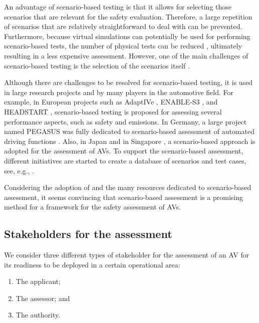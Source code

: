 \documentclass[twoside,twocolumn,9pt]{article}
\theoremstyle{plain}
\theoremstyle{remark}\newtheorem{remarkenv}{Remark}        %
\begin{document}
An advantage of scenario-based testing is that it allows for selecting those scenarios that are relevant for the safety evaluation. Therefore, a large repetition of scenarios that are relatively straightforward to deal with can be prevented. Furthermore, because virtual simulations can potentially be used for performing scenario-based tests, the number of physical tests can be reduced \autocite{ploeg2018cetran}, ultimately resulting in a less expensive assessment. However, one of the main challenges of scenario-based testing is the selection of the scenarios itself \autocite{riedmaier2020survey}. 

Although there are challenges to be resolved for scenario-based testing, it is used in large research projects and by many players in the automotive field. For example, in European projects such as AdaptIVe \autocite{roesener2017comprehensive}, ENABLE-S3 \autocite{leitner2019validation}, and HEADSTART \autocite{wagener2020headstart}, scenario-based testing is proposed for assessing several performance aspects, such as safety and emissions. In Germany, a large project named PEGASUS was fully dedicated to scenario-based assessment of automated driving functions \autocite{pegasus2019}. Also, in Japan \autocite{jacobo2019development} and in Singapore \autocite{cetran2020}, a scenario-based approach is adopted for the assessment of AVs. To support the scenario-based assessment, different initiatives are started to create a database of scenarios and test cases, see, e.g., \autocite{elrofai2018scenario,myers2020pass}.

Considering the adoption of and the many resources dedicated to scenario-based assessment, it seems convincing that scenario-based assessment is a promising method for a framework for the safety assessment of AVs.



\subsection{Stakeholders for the assessment}
\label{sec:stakeholders}

We consider three different types of stakeholder for the assessment of an AV for its readiness to be deployed in a certain operational area:
\begin{enumerate}
	\item The applicant;
	\item The assessor; and
	\item The authority.
\end{enumerate}
\end{document}
